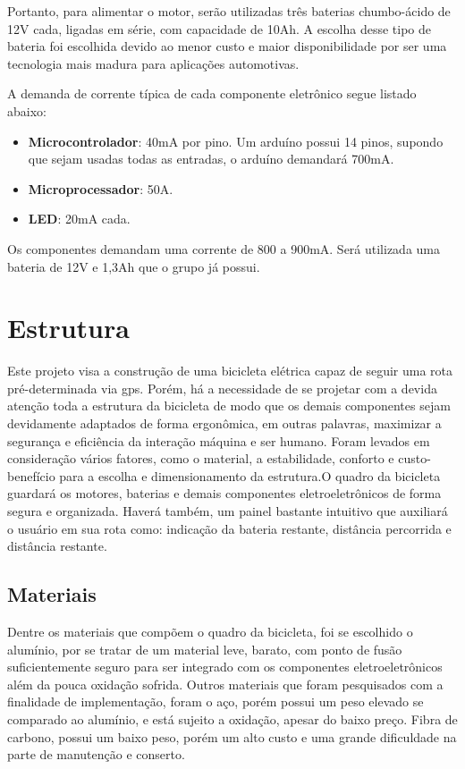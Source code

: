 	Portanto, para alimentar o motor, serão utilizadas três baterias chumbo-ácido de 12V cada, ligadas em série, com capacidade de 10Ah. A escolha desse tipo de bateria foi escolhida devido ao menor custo e maior disponibilidade por ser uma tecnologia mais madura para aplicações automotivas.

	A demanda de corrente típica de cada componente eletrônico segue listado abaixo:
	
	\begin{itemize}
		\item \textbf{Microcontrolador}: 40mA por pino. Um arduíno possui 14 pinos, supondo que sejam usadas todas as entradas, o arduíno demandará 700mA.
		\item \textbf{Microprocessador}: 50A.
		\item \textbf{LED}: 20mA cada.

	\end{itemize}

Os componentes demandam uma corrente de 800 a 900mA. Será utilizada uma bateria de 12V e 1,3Ah que o grupo já possui.

  
  \section{Estrutura}
  Este projeto visa a construção de uma bicicleta elétrica capaz de seguir uma rota pré-determinada via gps. Porém, há a necessidade de se projetar com a devida atenção toda a estrutura da bicicleta de modo que os demais componentes sejam devidamente adaptados de forma ergonômica, em outras palavras, maximizar a segurança e eficiência da interação máquina e ser humano.
Foram levados em consideração vários fatores, como o material, a estabilidade, conforto e custo-benefício para a escolha e dimensionamento da estrutura.O quadro da bicicleta guardará os motores, baterias e demais componentes eletroeletrônicos de forma segura e organizada. Haverá também, um painel bastante intuitivo que auxiliará o usuário em sua rota como: indicação da bateria restante, distância percorrida e distância restante.
	
	\subsection{Materiais}
	Dentre os materiais que compõem o quadro da bicicleta, foi se escolhido o alumínio, por se tratar de um material leve, barato, com ponto de fusão suficientemente seguro para ser integrado com os componentes eletroeletrônicos além da pouca oxidação sofrida. Outros materiais que foram pesquisados com a finalidade de implementação, foram o aço, porém possui um peso elevado se comparado ao alumínio, e está sujeito a oxidação, apesar do baixo preço. Fibra de carbono, possui um baixo peso, porém um alto custo e uma grande dificuldade na parte de manutenção e conserto.
	
